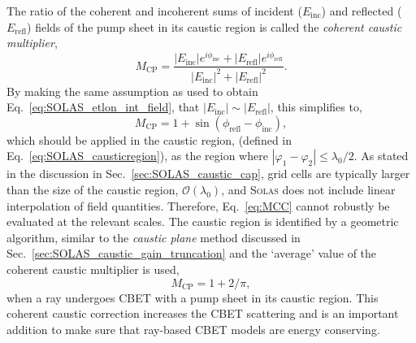 The ratio of the coherent and incoherent sums of incident ($E_{\text{inc}}$) and reflected ($E_{\text{refl}}$) fields of the pump sheet in its caustic region is called the \textit{coherent caustic multiplier},
\begin{equation}
    M_{\text{CP}} = \frac{|E_{\text{inc}}|e^{i\phi_{\text{inc}}} + |E_{\text{refl}}|e^{i\phi_{\text{refl}}}}{|E_{\text{inc}}|^2 + |E_{\text{refl}}|^2}.
\end{equation}
By making the same assumption as used to obtain Eq.~\ref{eq:SOLAS_etlon_int_field}, that $|E_{\text{inc}}|\sim |E_{\text{refl}}|$, this simplifies to,
\begin{equation}
    \label{eq:MCC}
    M_{\text{CP}} = 1 + \sin ( \phi_{\text{refl}} - \phi_{\text{inc}} ),
\end{equation}
which should be applied in the caustic region, (defined in Eq.~\ref{eq:SOLAS_causticregion}), as the region where $|\varphi_1-\varphi_2|\leq\lambda_0/2$.
As stated in the discussion in Sec.~\ref{sec:SOLAS_caustic_cap}, grid cells are typically larger than the size of the caustic region, $\mathcal{O}(\lambda_0)$, and \textsc{Solas} does not include linear interpolation of field quantities.
Therefore, Eq.~\ref{eq:MCC} cannot robustly be evaluated at the relevant scales.
The caustic region is identified by a geometric algorithm, similar to the \textit{caustic plane} method discussed in Sec.~\ref{sec:SOLAS_caustic_gain_truncation} and the `average' value of the coherent caustic multiplier is used,
\begin{equation}
    \label{eq:average_MCC}
    M_{\text{CP}} = 1 + 2/\pi,
\end{equation}
when a ray undergoes \ac{CBET} with a pump sheet in its caustic region.
This coherent caustic correction increases the \ac{CBET} scattering and is an important addition to make sure that ray-based \ac{CBET} models are energy conserving.

